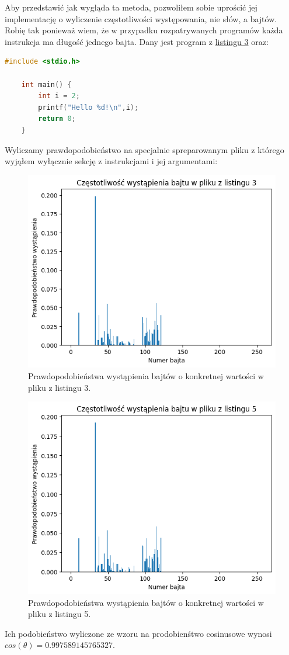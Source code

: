 Aby przedstawić jak wygląda ta metoda, pozwoliłem sobie uprościć jej implementację o wyliczenie
częstotliwości występowania, nie słów, a bajtów. Robię tak ponieważ wiem, że w przypadku rozpatrywanych programów każda instrukcja
ma długość jednego bajta. Dany jest program z \hyperref[lst:ello]{listingu 3} oraz:
\begin{lstlisting}[language=C,
    backgroundcolor=\color{EEGold!5!white},
    caption={Program podobny do programu z \hyperref[lst:ello]{listingu 3}. Jedyną różnicą jest obecność zmiennei $i$.},
    label={lst:helloC}]
    #include <stdio.h>

    int main() {
        int i = 2;
        printf("Hello %d!\n",i);
        return 0;
    }
\end{lstlisting}
Wyliczamy prawdopodobieństwo na specjalnie spreparowanym pliku z którego wyjąłem wyłącznie sekcję
z instrukcjami i jej argumentami:
\begin{figure}[H]
    \centering
    \includegraphics[width=0.9\linewidth]{rysunki/p1.png}
    \caption{Prawdopodobieństwa wystąpienia bajtów o konkretnej wartości w pliku z listingu 3.}
    \label{fig:enter-label}
\end{figure}
\begin{figure}[H]
    \centering
    \includegraphics[width=0.7\linewidth]{rysunki/p2.png}
    \caption{Prawdopodobieństwa wystąpienia bajtów o konkretnej wartości w pliku z listingu 5.}
    \label{fig:enter-label}
\end{figure}
Ich podobieństwo wyliczone ze wzoru na prodobienśtwo cosinusowe wynosi $cos(\theta) = 0.997589145765327$.
